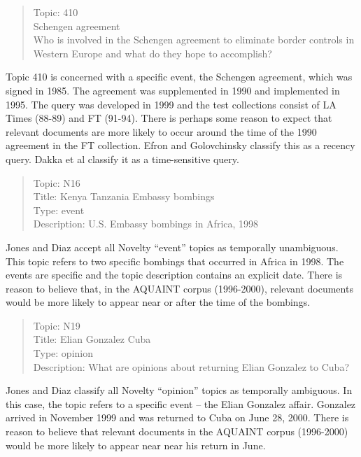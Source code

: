 \documentclass{sig-alternate}
\begin{document}
\begin{quote}
Topic: 410 \\
Schengen agreement \\
Who is involved in the Schengen agreement to eliminate border controls in Western Europe and what do they hope to accomplish? \\
\end{quote}

Topic 410 is concerned with a specific event, the Schengen agreement, which was signed in 1985.  The agreement was supplemented in 1990 and implemented in 1995. The query was developed in 1999 and the test collections consist of LA Times (88-89) and FT (91-94).  There is perhaps some reason to expect that relevant documents are more likely to occur around the time of the 1990 agreement in the FT collection.  Efron and Golovchinsky classify this as a recency query. Dakka et al classify it as a time-sensitive query.

\begin{quote}
Topic: N16 \\
Title: Kenya Tanzania Embassy bombings \\
Type: event \\
Description: U.S. Embassy bombings in Africa, 1998 \\
\end{quote}

Jones and Diaz accept all Novelty ``event'' topics as temporally unambiguous. This topic refers to two specific bombings that occurred in Africa in 1998. The events are specific and the topic description contains an explicit date.  There is reason to believe that, in the AQUAINT corpus (1996-2000), relevant documents would be more likely to appear near or after the time of the bombings.

\begin{quote}
Topic: N19 \\
Title: Elian Gonzalez Cuba  \\
Type: opinion \\
Description: What are opinions about returning Elian Gonzalez to Cuba? \\
\end{quote}

Jones and Diaz classify all Novelty ``opinion'' topics as temporally ambiguous. In this case, the topic refers to a specific event -- the Elian Gonzalez affair. Gonzalez arrived in November 1999 and was returned to Cuba on June 28, 2000. There is reason to believe that relevant documents in the AQUAINT corpus (1996-2000) would be more likely to appear near near his return in June.
\end{document}
